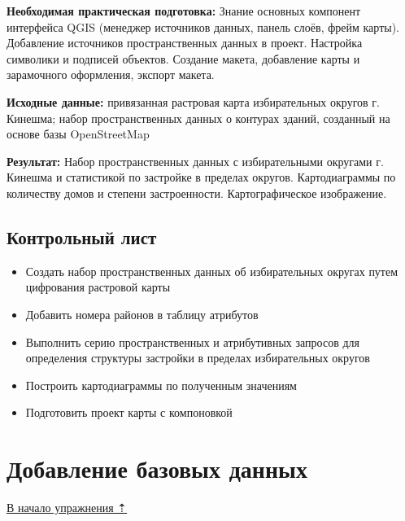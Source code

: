\documentclass[
  12pt,
]{book}
\providecommand{\tightlist}{%
  \setlength{\itemsep}{0pt}\setlength{\parskip}{0pt}}
\begin{document}
\textbf{Необходимая практическая подготовка:} Знание основных компонент интерфейса QGIS (менеджер источников данных, панель слоёв, фрейм карты). Добавление источников пространственных данных в проект. Настройка символики и подписей объектов. Создание макета, добавление карты и зарамочного оформления, экспорт макета.

\textbf{Исходные данные:} привязанная растровая карта избирательных округов г. Кинешма; набор пространственных данных о контурах зданий, созданный на основе базы OpenStreetMap

\textbf{Результат:} Набор пространственных данных с избирательными округами г. Кинешма и статистикой по застройке в пределах округов. Картодиаграммы по количеству домов и степени застроенности. Картографическое изображение.

\hypertarget{digitizing-control}{%
\subsection{Контрольный лист}\label{digitizing-control}}

\begin{itemize}
\tightlist
\item
  Создать набор пространственных данных об избирательных округах путем цифрования растровой карты
\item
  Добавить номера районов в таблицу атрибутов
\item
  Выполнить серию пространственных и атрибутивных запросов для определения структуры застройки в пределах избирательных округов
\item
  Построить картодиаграммы по полученным значениям
\item
  Подготовить проект карты с компоновкой
\end{itemize}

\hypertarget{digitizing-basedata}{%
\section{Добавление базовых данных}\label{digitizing-basedata}}

\protect\hyperlink{digitizingf-districts}{В начало упражнения ⇡}
\end{document}
